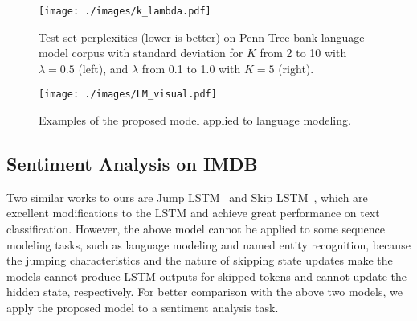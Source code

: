 \documentclass[letterpaper]{article} \usepackage{aaai19}  \usepackage{times}  \usepackage{helvet}  \usepackage{courier}  \usepackage{url}  \usepackage{graphicx}  \usepackage{amsmath}
\begin{document}
\begin{figure}[t]
\centering
  \texttt{[image: ./images/k\_lambda.pdf]}
  \caption{Test set perplexities (lower is better) on Penn Tree-bank language model corpus with standard deviation for $K$ from 2 to 10 with $\lambda=0.5$ (left), and $\lambda$ from 0.1 to 1.0 with $K = 5$ (right).} \label{fig:LMlambda}
\end{figure}

\begin{figure}
\centering
  \texttt{[image: ./images/LM\_visual.pdf]}
  \caption{Examples of the proposed model applied to language modeling.} \label{fig:LM}
\end{figure}



\begin{table}[t]
\centering
{}
\caption{Accuracy on the IMDB test set.}
  \label{tab:sentiment}
\end{table}


\subsection{Sentiment Analysis on IMDB}
Two similar works to ours are Jump LSTM~\cite{yu2017learning} and Skip LSTM~\cite{campos2017skip}, which are excellent modifications to the LSTM and achieve great performance on text classification. However, the above model cannot be applied to some sequence modeling tasks, such as language modeling and named entity recognition, because the jumping characteristics and the nature of skipping state updates make the models cannot produce LSTM outputs for skipped tokens and cannot update the hidden state, respectively. For better comparison with the above two models, we apply the proposed model to a sentiment analysis task.
\end{document}
